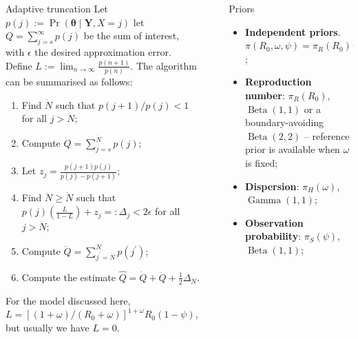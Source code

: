 \documentclass[final]{beamer}
\newcommand{\disp}{\omega}					%
\newcommand{\seqrate}{\psi}					%
\newcommand{\pr}{\operatorname{Pr}} %
\newlength{\sepwidth}
\newlength{\colwidth}
\newcommand{\separatorcolumn}{\begin{column}{\sepwidth}\end{column}}
\begin{document}
\begin{frame}[t]
\begin{columns}[t]
\begin{column}{\colwidth}
  \begin{alertblock}{Adaptive truncation}
  Let $p(j) := \pr\left(\boldsymbol{\theta} \mid \boldsymbol{Y}, X = j \right)$ let $Q = \sum_{j=s}^\infty p(j)$ be the sum of interest, with $\epsilon$ the desired approximation error.
  Define $L := \lim_{n \to \infty} \frac{p(n + 1)}{p(n)}$.
  The algorithm can be summarised as follows:
  \begin{enumerate}
  \item Find $\dot{N}$ such that $p(j + 1)/p(j) < 1$ for all $j > \dot{N}$;
  \item  Compute $\dot{Q} = \sum_{j=s}^{\dot{N}} p(j)$;
  \item Let $z_j = \frac{p(j+1) p(j)}{p(j) - p(j + 1)}$;
  \item  Find $\ddot{N} \geq \dot{N}$ such that $p(j) \left( \frac{L}{1-L}\right) + z_j =: \Delta_j < 2\epsilon$ for all $j > \ddot{N}$;
  \item Compute $\ddot{Q} = \sum_{{j^\prime}=\dot{N}}^{\ddot{N}} p(j^\prime)$;
  \item Compute the estimate $\hat{Q} = \dot{Q} + \ddot{Q} + \frac{1}{2}\Delta_{\ddot{N}}$.
  \end{enumerate}
  For the model discussed here, $L = \left[(1 + \disp)/(R_0 + \disp)\right]^{1 + \disp} R_0 (1-\seqrate)$, but usually we have $L=0$.
  \end{alertblock}
  \end{column}

  \separatorcolumn

  \begin{column}{\colwidth}

    \begin{block}{Priors}
     \begin{itemize}
     \item \textbf{Independent priors}.  $\pi(R_0, \disp, \seqrate) = \pi_R(R_0)\pi_H(\disp)\pi_S(\psi)$;
     \item \textbf{Reproduction number}: $\pi_R(R_0)$, $\operatorname{Beta}(1, 1)$ or a boundary-avoiding $\operatorname{Beta}(2, 2)$ -- reference prior is available when $\disp$ is fixed;
     \item \textbf{Dispersion}: $\pi_H(\disp)$, $\operatorname{Gamma}(1, 1)$;
     \item \textbf{Observation probability}: $\pi_S(\psi)$, $\operatorname{Beta}(1, 1)$;
    \end{itemize}



\end{block}
\end{column}
\end{columns}
\end{frame}
\end{document}
